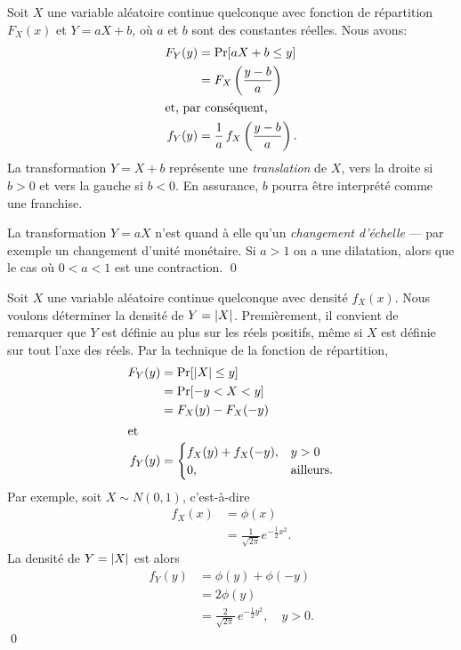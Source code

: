 \begin{exemple}
  Soit $X$ une variable aléatoire continue quelconque avec fonction de
  répartition $F_X(x)$ et $Y = aX + b$, où $a$ et $b$ sont des
  constantes réelles. Nous avons:
  \begin{align*}
    F_Y(y)
    &= \operatorname{Pr} [ a X + b \leq y ] \\
    &= F_X\left( \frac{y - b}{a} \right) \\
    \intertext{et, par conséquent,}
    f_Y(y)
    &= \frac{1}{a}\, f_X\left( \frac{y - b}{a} \right).
  \end{align*}
  La transformation $Y = X + b$ représente une \emph{translation} de
  $X$, vers la droite si $b > 0$ et vers la gauche si $b < 0$. En
  assurance, $b$ pourra être interprété comme une franchise.

  La transformation $Y = aX$ n'est quand à elle qu'un \emph{changement
    d'échelle} --- par exemple un changement d'unité monétaire. Si $a
  > 1$ on a une dilatation, alors que le cas où $0 < a < 1$ est une
  contraction. %
  \qed
\end{exemple}

\begin{exemple}
  \label{ex:transformations:val_abs}
  Soit $X$ une variable aléatoire continue quelconque avec densité
  $f_X(x)$. Nous voulons déterminer la densité de $Y = \lvert X \rvert$. Premièrement, il
  convient de remarquer que $Y$ est définie au plus sur les réels
  positifs, même si $X$ est définie sur tout l'axe des réels. Par la
  technique de la fonction de répartition,
  \begin{align*}
    F_Y(y)
    &= \operatorname{Pr} [ \lvert X \rvert \leq y ] \\
    &= \operatorname{Pr} [ -y < X < y ] \\
    &= F_X(y) - F_X(-y) \\
    \intertext{et}
    f_Y(y)
    &=
    \begin{cases}
      f_X(y) + f_X(-y), & y > 0 \\
      0, & \text{ailleurs}.
    \end{cases}
  \end{align*}
  Par exemple, soit $X \sim N(0, 1)$, c'est-à-dire
  \begin{align*}
    f_X(x)
    &= \phi(x) \\
    &= \frac{1}{\sqrt{2\pi}} e^{- \frac{1}{2} x^2}.
  \end{align*}
  La densité de $Y = \lvert X \rvert$ est alors
  \begin{align*}
    f_Y(y)
    &= \phi(y) + \phi(-y) \\
    &= 2 \phi(y) \\
    &= \frac{2}{\sqrt{2\pi}}\, e^{- \frac{1}{2} y^2}, \quad y > 0.
  \end{align*}
  \qed
\end{exemple}

